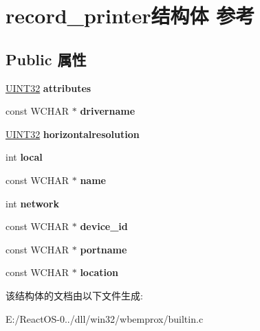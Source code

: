 \hypertarget{structrecord__printer}{}\section{record\+\_\+printer结构体 参考}
\label{structrecord__printer}
\subsection*{Public 属性}
\begin{DoxyCompactItemize}
\item 
\mbox{\label{structrecord__printer_a1df641720e21a8357d2c203be5f260f6}} 
\hyperlink{_processor_bind_8h_ae1e6edbbc26d6fbc71a90190d0266018}{U\+I\+N\+T32} {\bfseries attributes}
\item 
\mbox{\label{structrecord__printer_ac9d66feecfb6ae8b5854ffb63d003d19}} 
const W\+C\+H\+AR $\ast$ {\bfseries drivername}
\item 
\mbox{\label{structrecord__printer_a9c0ddbd36210972f4f7f5ebf50cd903d}} 
\hyperlink{_processor_bind_8h_ae1e6edbbc26d6fbc71a90190d0266018}{U\+I\+N\+T32} {\bfseries horizontalresolution}
\item 
\mbox{\label{structrecord__printer_a91c64c80214fe68a578653520452a5c1}} 
int {\bfseries local}
\item 
\mbox{\label{structrecord__printer_a7b15cc921e7591807edb060e6c844c4f}} 
const W\+C\+H\+AR $\ast$ {\bfseries name}
\item 
\mbox{\label{structrecord__printer_a8b110ab64a396759927961c749a81d50}} 
int {\bfseries network}
\item 
\mbox{\label{structrecord__printer_af03de4eef2ceed3691b18dbfc47cba65}} 
const W\+C\+H\+AR $\ast$ {\bfseries device\+\_\+id}
\item 
\mbox{\label{structrecord__printer_a6bba2049b38ed9b1b295f2f5ddab77b5}} 
const W\+C\+H\+AR $\ast$ {\bfseries portname}
\item 
\mbox{\label{structrecord__printer_ad958f9176ef7fce6ba14bca2364e8a5b}} 
const W\+C\+H\+AR $\ast$ {\bfseries location}
\end{DoxyCompactItemize}


该结构体的文档由以下文件生成\+:\begin{DoxyCompactItemize}
\item 
E\+:/\+React\+O\+S-\/0../dll/win32/wbemprox/builtin.\+c\end{DoxyCompactItemize}
